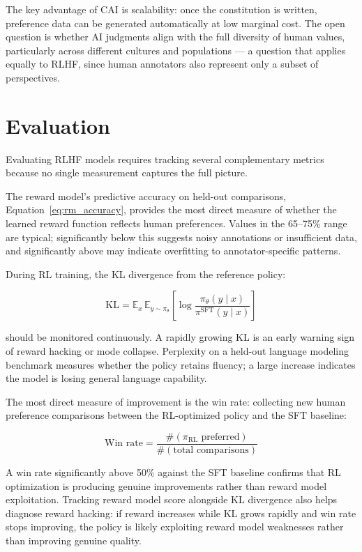 \documentclass{book}
\begin{document}
The key advantage of CAI is scalability: once the constitution is written,
preference data can be generated automatically at low marginal cost. The
open question is whether AI judgments align with the full diversity of
human values, particularly across different cultures and populations --- a
question that applies equally to RLHF, since human annotators also
represent only a subset of perspectives.

\section{Evaluation}
\label{sec:rlhf_evaluation}

Evaluating RLHF models requires tracking several complementary metrics
because no single measurement captures the full picture.

The reward model's predictive accuracy on held-out comparisons,
Equation~\ref{eq:rm_accuracy}, provides the most direct measure of whether
the learned reward function reflects human preferences. Values in the
65--75\% range are typical; significantly below this suggests noisy
annotations or insufficient data, and significantly above may indicate
overfitting to annotator-specific patterns.

During RL training, the KL divergence from the reference policy:

\begin{equation}
\label{eq:eval_kl}
\mathrm{KL} = \mathbb{E}_x\, \mathbb{E}_{y \sim \pi_\theta}
    \left[ \log \frac{\pi_\theta(y \mid x)}{\pi^{\text{SFT}}(y \mid x)} \right]
\end{equation}

should be monitored continuously. A rapidly growing KL is an early warning
sign of reward hacking or mode collapse. Perplexity on a held-out language
modeling benchmark measures whether the policy retains fluency; a large
increase indicates the model is losing general language capability.

The most direct measure of improvement is the win rate: collecting new
human preference comparisons between the RL-optimized policy and the SFT
baseline:

\begin{equation}
\label{eq:win_rate}
\text{Win rate}
= \frac{\#(\pi_{\text{RL}} \text{ preferred})}
       {\#(\text{total comparisons})}
\end{equation}

A win rate significantly above 50\% against the SFT baseline confirms
that RL optimization is producing genuine improvements rather than
reward model exploitation. Tracking reward model score alongside KL
divergence also helps diagnose reward hacking: if reward increases while
KL grows rapidly and win rate stops improving, the policy is likely
exploiting reward model weaknesses rather than improving genuine quality.
\end{document}
